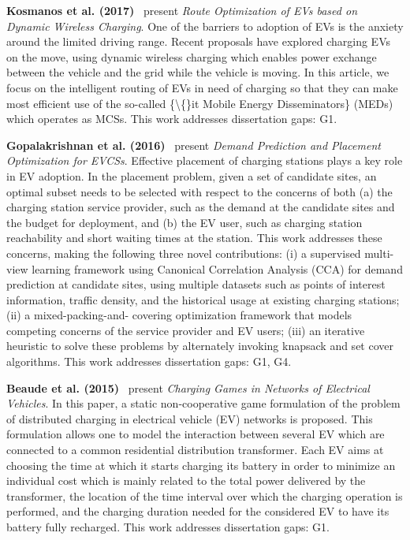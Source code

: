 \documentclass[letterpaper, 12pt, oneside, doublespacing]{Thesis}
\begin{document}
\noindent \textbf{Kosmanos et al. (2017)}~\cite{route_optimization_2017} present \textit{Route Optimization of EVs based on Dynamic Wireless Charging}. One of the barriers to adoption of EVs is the anxiety around the limited driving range. Recent proposals have explored charging EVs on the move, using dynamic wireless charging which enables power exchange between the vehicle and the grid while the vehicle is moving. In this article, we focus on the intelligent routing of EVs in need of charging so that they can make most efficient use of the so-called \{\textbackslash\{\}it Mobile Energy Disseminators\} (MEDs) which operates as MCSs. This work addresses dissertation gaps: G1.



\noindent \textbf{Gopalakrishnan et al. (2016)}~\cite{demand_prediction_2016} present \textit{Demand Prediction and Placement Optimization for EVCSs}. Effective placement of charging stations plays a key role in EV adoption. In the placement problem, given a set of candidate sites, an optimal subset needs to be selected with respect to the concerns of both (a) the charging station service provider, such as the demand at the candidate sites and the budget for deployment, and (b) the EV user, such as charging station reachability and short waiting times at the station. This work addresses these concerns, making the following three novel contributions: (i) a supervised multi-view learning framework using Canonical Correlation Analysis (CCA) for demand prediction at candidate sites, using multiple datasets such as points of interest information, traffic density, and the historical usage at existing charging stations; (ii) a mixed-packing-and- covering optimization framework that models competing concerns of the service provider and EV users; (iii) an iterative heuristic to solve these problems by alternately invoking knapsack and set cover algorithms. This work addresses dissertation gaps: G1, G4.



\noindent \textbf{Beaude et al. (2015)}~\cite{introducing_decentralized_2015} present \textit{Charging Games in Networks of Electrical Vehicles}. In this paper, a static non-cooperative game formulation of the problem of distributed charging in electrical vehicle (EV) networks is proposed. This formulation allows one to model the interaction between several EV which are connected to a common residential distribution transformer. Each EV aims at choosing the time at which it starts charging its battery in order to minimize an individual cost which is mainly related to the total power delivered by the transformer, the location of the time interval over which the charging operation is performed, and the charging duration needed for the considered EV to have its battery fully recharged. This work addresses dissertation gaps: G1.
\end{document}

